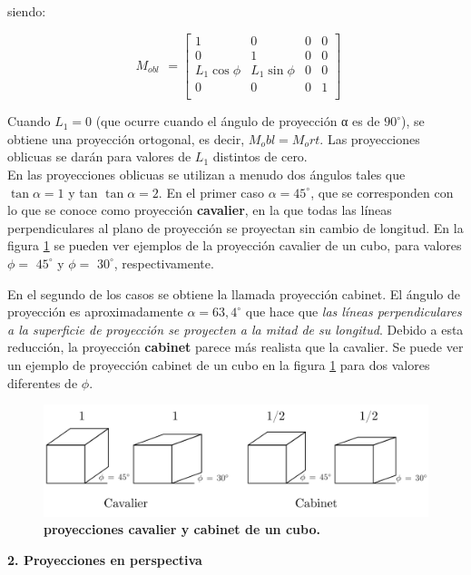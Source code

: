 siendo:

\begin{equation}
\begin{array}{rccl}
M_{obl}
\end{array}
=
\left[
\begin{array}{rccl}
1 & 0 & 0 & 0\\
0 & 1 & 0 & 0\\
L_1\cos{\phi} & L_1\sin{\phi} & 0 & 0\\
0 & 0 & 0 & 1\\
\end{array}
\right]
\end{equation}

\vspace{5mm}
Cuando $L_1= 0$ (que ocurre cuando el ángulo de proyección α es de $90^{\circ}$), se obtiene una proyección ortogonal, es decir, $M_obl = M_ort$. Las proyecciones
oblicuas se darán para valores de $L_1$ distintos de cero.\\
En las proyecciones oblicuas se utilizan a menudo dos ángulos tales
que $\tan{\alpha} = 1$ y tan $\tan{\alpha} = 2$. En el primer caso $\alpha = 45^{\circ}$, que se corresponden con lo que se conoce como proyección \textbf{cavalier}, en la que todas las líneas perpendiculares al plano de proyección se proyectan sin cambio de longitud. En la figura \ref{geo-per6} se pueden ver ejemplos de la proyección cavalier de un cubo, para valores $\phi =$ $45^{\circ}$ y $\phi =$ $30^{\circ}$, respectivamente.


En el segundo de los casos se obtiene la llamada proyección cabinet. El ángulo de proyección es aproximadamente $\alpha = 63,4^{\circ}$ que hace que \textit{las líneas perpendiculares a la superficie de proyección se proyecten a la mitad de su longitud}. Debido a esta reducción, la proyección \textbf{cabinet} parece más realista que la cavalier. Se puede ver un ejemplo de proyección cabinet de un cubo en la figura \ref{geo-per6} para dos valores diferentes de $\phi$.


\begin{figure}[h]
    \includegraphics[width=14cm]{Img/GEO/geo-per-6.png}
    \centering
    \caption{\footnotesize{\textbf{proyecciones cavalier y cabinet de un cubo.}}}
    \label{geo-per6}
\end{figure}
\clearpage
\textbf{2. Proyecciones en perspectiva}

